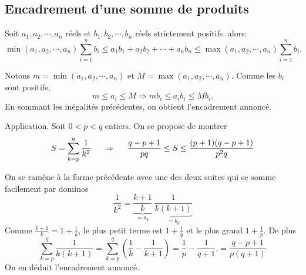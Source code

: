 \subsection{Encadrement d'une somme de produits}
\begin{prop}
  Soit $a_1, a_2, \cdots, a_n$ réels et $b_1, b_2, \cdots, b_n$ réels strictement positifs. alors:
  \begin{displaymath}
    \min(a_1,a_2,\cdots,a_n) \sum_{i=1}^n b_i \leq a_1b_1 + a_2b_2 + \cdots + a_n b_n \leq \max(a_1,a_2,\cdots,a_n) \sum_{i=1}^n b_i.
  \end{displaymath}
\end{prop}
\begin{demo}
  Notons $m = \min(a_1,a_2,\cdots,a_n)$ et $M = \max(a_1,a_2,\cdots,a_n)$. Comme les $b_i$ sont positifs,
  \begin{displaymath}
    m \leq a_i \leq M \Rightarrow m b_i \leq a_i b_i \leq Mb_i .
  \end{displaymath}
En sommant les inégalités précédentes, on obtient l'encadrement annoncé.
\end{demo}
Application. Soit $0 < p < q$ entiers. On se propose de montrer
\begin{displaymath}
  S = \sum_{k = p}^{q}\frac{1}{k^2} \hspace{0.5cm}\Rightarrow \hspace{0.5cm}\frac{q-p+1}{pq} \leq S \leq \frac{(p+1)(q-p+1)}{p^2q}
\end{displaymath}
\begin{demo}
  On se ramène à la forme précédente avec une des deux suites qui se somme facilement par dominos
\begin{displaymath}
  \frac{1}{k^2} = \underset{= a_k}{\underbrace{\frac{k+1}{k}}}\:\underset{= b_k}{\underbrace{\frac{1}{k(k+1)}}}
\end{displaymath}
Comme $\frac{k+1}{k} = 1+\frac{1}{k}$, le plus petit terme est $1+\frac{1}{q}$ et le plus grand $1+\frac{1}{p}$. De plus
\begin{displaymath}
  \sum_{k=p}^{q}\frac{1}{k(k+1)} = \sum_{k=p}^{q}\left( \frac{1}{k}-\frac{1}{k+1}\right) = \frac{1}{p}-\frac{1}{q+1} .
  = \frac{q-p+1}{p(q+1)}
\end{displaymath}
On en déduit l'encadrement annoncé.
\end{demo}


